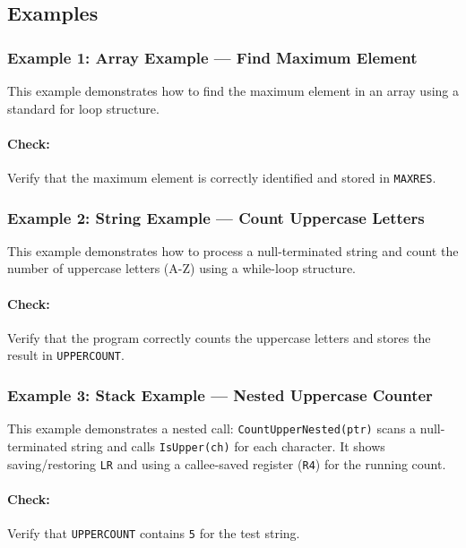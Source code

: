 \subsection{Examples}

\subsubsection{Example 1: Array Example — Find Maximum Element}
This example demonstrates how to find the maximum element in an array using a standard for loop structure.

\paragraph{Check:} Verify that the maximum element is correctly identified and stored in \texttt{MAXRES}.
\newpage

\subsubsection{Example 2: String Example — Count Uppercase Letters}
This example demonstrates how to process a null-terminated string and count the number of uppercase letters (A-Z) using a while-loop structure.

\paragraph{Check:} Verify that the program correctly counts the uppercase letters and stores the result in \texttt{UPPERCOUNT}.

\newpage
\subsubsection{Example 3: Stack Example — Nested Uppercase Counter}
This example demonstrates a nested call: \texttt{CountUpperNested(ptr)} scans a null-terminated string and calls \texttt{IsUpper(ch)} for each character. It shows saving/restoring \texttt{LR} and using a callee-saved register (\texttt{R4}) for the running count.

\paragraph{Check:} Verify that \texttt{UPPERCOUNT} contains \texttt{5} for the test string.


